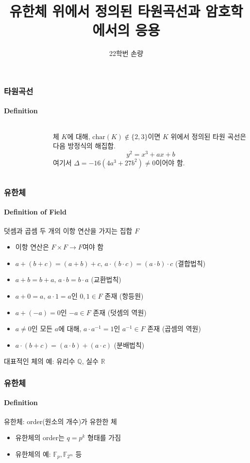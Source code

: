 \documentclass[aspectratio=169,mathserif]{beamer}
\title{유한체 위에서 정의된 타원곡선과 암호학에서의 응용}
\author[Sohn]{22학번 손량}
\newcommand{\Fp}{\mathbb{F}_p}
\newcommand{\Ftwom}{\mathbb{F}_{2^m}}
\begin{document}
  \begin{frame}
    \titlepage
  \end{frame}

  \begin{frame}
    \frametitle{타원곡선}
    \framesubtitle{Definition}

    \begin{columns}
      \begin{figure}
        \centering
        \scalebox{0.5}{}
      \end{figure}
      체 \(K\)에 대해, \(\mathrm{char}(K)\not\in\{2,3\}\)이면 \(K\) 위에서 정의된 타원 곡선은 다음 방정식의 해집합.
      \[y^2 = x^3 + ax + b\]
      여기서 \(\Delta = -16(4a^3 + 27b^2) \not= 0\)이어야 함.
    \end{columns}
  \end{frame}

  \begin{frame}
    \frametitle{유한체}
    \framesubtitle{Definition of Field}
    덧셈과 곱셈 두 개의 이항 연산을 가지는 집합 \(F\)
    \pause
    \begin{itemize}
      \item 이항 연산은 \(F\times F\to F\)여야 함
      \pause
      \item \(a+(b+c)=(a+b)+c,\,a\cdot(b\cdot c)=(a\cdot b)\cdot c\) (결합법칙)
      \item \(a+b=b+a,\,a\cdot b=b\cdot a\) (교환법칙)
      \item \(a+0=a,\,a\cdot 1=a\)인 \(0, 1\in F\) 존재 (항등원)
      \item \(a+(-a)=0\)인 \(-a\in F\) 존재 (덧셈의 역원)
      \item \(a\not=0\)인 모든 \(a\)에 대해, \(a\cdot a^{-1}=1\)인 \(a^{-1}\in F\) 존재 (곱셈의 역원)
      \item \(a\cdot(b+c)=(a\cdot b)+(a\cdot c)\) (분배법칙)
    \end{itemize}
    \pause
    대표적인 체의 예: 유리수 \(\mathbb{Q}\), 실수 \(\mathbb{R}\)
  \end{frame}

  \begin{frame}
    \frametitle{유한체}
    \framesubtitle{Definition}

    유한체: order(원소의 개수)가 유한한 체
    \begin{itemize}
      \item 유한체의 order는 \(q=p^k\) 형태를 가짐
      \item 유한체의 예: \(\Fp, \Ftwom\) 등
    \end{itemize}
  \end{frame}
\end{document}
